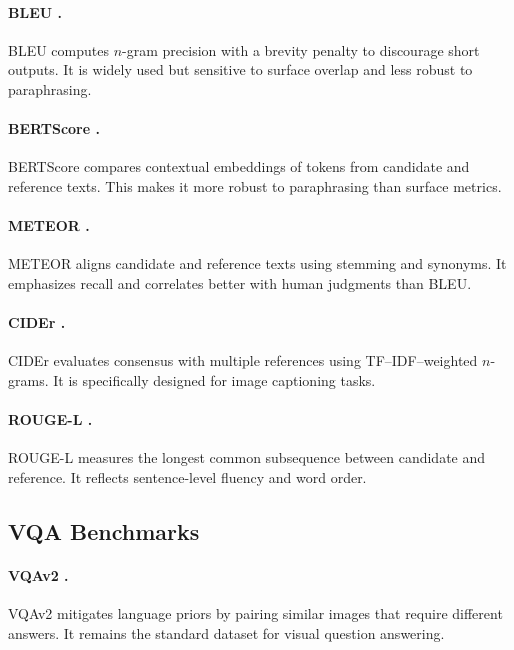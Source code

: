 \documentclass[11pt]{article}
\begin{document}
\paragraph{BLEU \citep{papineni2002bleu}.}
BLEU computes $n$-gram precision with a brevity penalty to discourage short outputs. It is widely used but sensitive to surface overlap and less robust to paraphrasing.  

\paragraph{BERTScore \citep{zhang2019bertscore}.}
BERTScore compares contextual embeddings of tokens from candidate and reference texts. This makes it more robust to paraphrasing than surface metrics.  

\paragraph{METEOR \citep{banerjee2005meteor}.}
METEOR aligns candidate and reference texts using stemming and synonyms. It emphasizes recall and correlates better with human judgments than BLEU.  

\paragraph{CIDEr \citep{vedantam2015cider}.}
CIDEr evaluates consensus with multiple references using TF–IDF–weighted $n$-grams. It is specifically designed for image captioning tasks.  

\paragraph{ROUGE-L \citep{lin2004rouge}.}
ROUGE-L measures the longest common subsequence between candidate and reference. It reflects sentence-level fluency and word order.  



\subsection{VQA Benchmarks}
\paragraph{VQAv2 \citep{goyal2017making}.}
VQAv2 mitigates language priors by pairing similar images that require different answers. It remains the standard dataset for visual question answering.  
\end{document}
